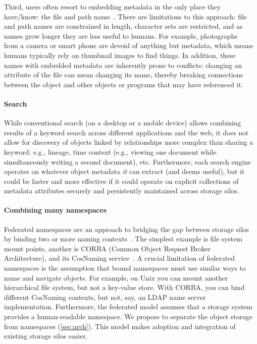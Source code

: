 Third, users often resort to embedding metadata in the only place they have/know: the file and path name~\cite{9229638, guo2012burrito}.
There are limitations to this approach: file and path names are constrained in length, character sets are restricted, and as names grow longer they are less useful to humans.
For example, photographs from a camera or smart
phone are devoid of anything but metadata, which means humans typically rely on thumbnail images to find things.  In addition, these names with embedded metadata are inherently prone to conflicts: changing an attribute of the file can mean changing its name, thereby breaking connections between the object and other objects or programs that may have referenced it.

\paragraph{Search} While conventional search (on a desktop or a mobile device) allows combining results of
a keyword search across different applications and the web, it does not allow for discovery of objects linked
by relationships more complex than sharing a keyword: e.g., lineage, time context (e.g., viewing one document
while simultaneously writing a second document), etc.
Furthermore, each search engine operates on whatever object metadata \textit{it} can extract (and deems useful),
but it could be faster and more effective if it could operate on explicit collections of metadata attributes securely and
persistently maintained across storage silos. %

\paragraph{Combining many namespaces}

Federated namespaces are an approach to bridging the gap between storage silos by binding two or more naming contexts~\cite{namespace-federation-ibm, huawei, kubernetes, cloudera, netapp-patent}.
The simplest example is file system mount points, another is CORBA (Common Object Request Broker Architecture), and its CosNaming service~\cite{cos-naming-oracle, omg-naming}.
A crucial limitation of federated namespaces is the assumption that bound namespaces must use similar ways to name and navigate objects.
For example, on Unix you can mount another hierarchical file system, but not a key-value store. With CORBA, you can bind different CosNaming contexts, but not, say, an LDAP name server implementation.
Furthermore, the federated model assumes that a storage system provides a human-readable namespace.
We propose to separate the object storage from namespaces (\autoref{sec:arch}). This model makes adoption and integration of existing storage silos easier.

